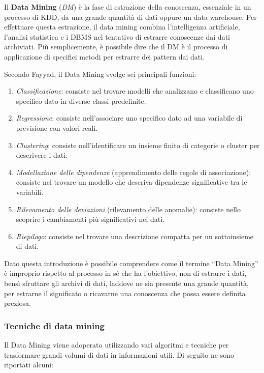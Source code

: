 Il \textbf{Data Mining} (\textit{DM}) è la fase di estrazione della conoscenza, essenziale in un processo di KDD, da una grande quantità di dati oppure un data warehouse. Per effettuare questa estrazione, il data mining combina l’intelligenza artificiale, l’analisi statistica e i DBMS nel tentativo di estrarre conoscenze dai dati archiviati. Più semplicemente, è possibile dire che il DM è il processo di applicazione di specifici metodi per estrarre dei pattern dai dati.\cite{citeseerx_data_mining}

Secondo Fayyad, il Data Mining svolge sei principali funzioni:\cite{aircconline_data_mining}

\begin{enumerate}
    \item \textit{Classificazione}: consiste nel trovare modelli che analizzano e classificano uno specifico dato in diverse classi predefinite.
    \item \textit{Regressione}: consiste nell’associare uno specifico dato ad una variabile di previsione con valori reali.
    \item \textit{Clustering}: consiste nell’identificare un insieme finito di categorie o cluster per descrivere i dati.
    \item \textit{Modellazione delle dipendenze} (apprendimento delle regole di associazione): consiste nel trovare un modello che descriva dipendenze significative tra le variabili.
    \item \textit{Rilevamento delle deviazioni} (rilevamento delle anomalie): consiste nello scoprire i cambiamenti più significativi nei dati.
    \item \textit{Riepilogo}: consiste nel trovare una descrizione compatta per un sottoinsieme di dati.
\end{enumerate}

Dato questa introduzione è possibile comprendere come il termine “Data Mining” è improprio rispetto al processo in sé che ha l’obiettivo, non di estrarre i dati, bensì sfruttare gli archivi di dati, laddove ne sia presente una grande quantità, per estrarne il significato o ricavarne una conoscenza che possa essere definita preziosa.\cite{aws_data_mining}

\subsubsection{Tecniche di data mining}

Il Data Mining viene adoperato utilizzando vari algoritmi e tecniche per trasformare grandi volumi di dati in informazioni utili. Di seguito ne sono riportati alcuni:\cite{ibm_data_mining}

